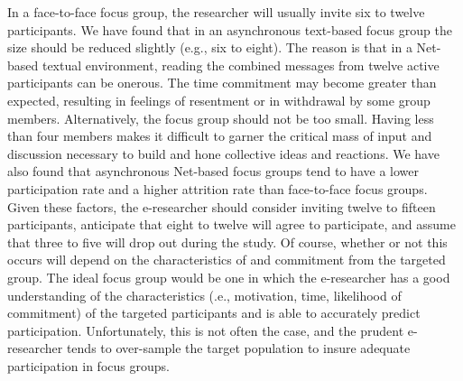 \documentclass[a4]{article}
\begin{document}
In a face-to-face focus group, the researcher will usually invite six to twelve participants. We have found that in an asynchronous text-based focus group the size should
be reduced slightly (e.g., six to eight). The reason is that in a Net-based textual environment, reading the combined messages from twelve active participants can be onerous. The time commitment may become greater than expected, resulting in feelings of resentment or in withdrawal by some group members. Alternatively, the focus group should not be too small. Having less than four members makes it difficult to garner the critical mass of input and discussion necessary to build and hone collective ideas and reactions. We have also found that asynchronous Net-based focus groups tend to have a lower participation rate and a higher attrition rate than face-to-face focus groups. Given these factors, the e-researcher should consider inviting twelve to fifteen participants, anticipate that eight to twelve will agree to participate, and assume that three to five will drop out during the study. Of course, whether or not this occurs will depend on the characteristics of and commitment from the targeted group. The ideal focus group would be one in which the e-researcher has a good understanding of the characteristics (.e., motivation, time, likelihood of commitment) of the targeted participants and is able to accurately predict participation. Unfortunately, this is not often the case, and the prudent e-researcher tends to over-sample the target population to insure adequate participation in focus groups.
\end{document}
